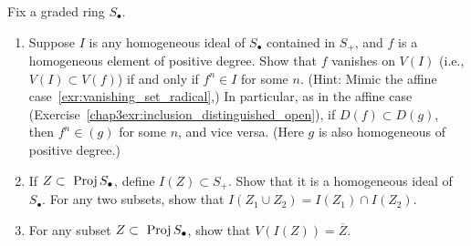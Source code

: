 \documentclass[11pt,fleqn]{book} %
\begin{document}
\begin{exr}\label{chap4exr:4.5.H}
Fix a graded ring $S_\bullet$.
\begin{enumerate}[label=(\alph*)]
\item Suppose $I$ is any homogeneous ideal of $S_\bullet$ contained in $S_+$, and $f$ is a homogeneous element of positive degree. Show that $f$ vanishes on $V(I)$ (i.e.,$V(I) \subset V(f)$) if and only if $f^n ∈ I$ for some $n$. (Hint: Mimic the affine case~\ref{exr:vanishing_set_radical},) In particular, as in the affine case (Exercise~\ref{chap3exr:inclusion_distinguished_open}), if $D(f) \subset D(g)$, then $f^n \in (g)$ for some $n$, and vice versa. (Here $g$ is also homogeneous of positive degree.)
\item If $Z \subset \text{ Proj\,} S_\bullet$, define $I(Z) \subset S_+$. Show that it is a homogeneous ideal of $S_\bullet$. For any two subsets, show that $I(Z_1 \cup Z_2) = I(Z_1) \cap I(Z_2)$.
\item For any subset $Z \subset \text{ Proj\,} S_\bullet$, show that $V(I(Z)) = \overline{Z}$.
\end{enumerate}
\end{exr}
\end{document}
